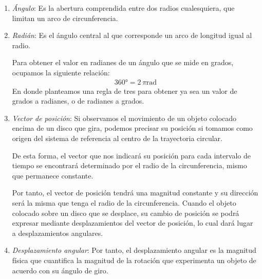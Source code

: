 \documentclass[14pt]{extarticle}
\begin{document}
\begin{enumerate}
\item \textit{Ángulo}: Es la abertura comprendida entre dos radios cualesquiera, que limitan un arco de circunferencia.
\item \textit{Radián}: Es el ángulo central al que corresponde un arco de longitud igual al radio.
\begin{figure}[H]
\centering
{}
\end{figure}
Para obtener el valor en radianes de un ángulo que se mide en grados, ocupamos la siguiente relación:
\begin{align*}
\ang{360} = 2 \, \pi \unit{\radian}
\end{align*}
En donde planteamos una regla de tres para obtener ya sea un valor de grados a radianes, o de radianes a grados.
\item \textit{Vector de posición}: Si observamos el movimiento de un objeto colocado encima de un disco que gira, podemos precisar su posición si tomamos como origen del sistema de referencia al centro de la trayectoria circular.

De esta forma, el vector que nos indicará su posición para cada intervalo de tiempo se encontrará determinado por el radio de la circunferencia, mismo que permanece constante.

Por tanto, el vector de posición tendrá una magnitud constante y su dirección será la misma que tenga el radio de la circunferencia. Cuando el objeto colocado sobre un disco que se desplace, su cambio de posición se podrá expresar mediante desplazamientos del vector de posición, lo cual dará lugar a desplazamientos angulares.
\item \textit{Desplazamiento angular}: Por tanto, el desplazamiento angular es la magnitud física que cuantifica la magnitud de la rotación que experimenta un objeto de acuerdo con su ángulo de giro.


\end{enumerate}
\end{document}
